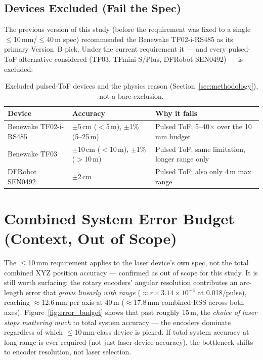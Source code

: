 \documentclass[11pt]{article}
\begin{document}
\subsection{Devices Excluded (Fail the Spec)}

The previous version of this study (before the requirement was fixed to a single $\leq$10\,mm/$\leq$40\,m spec) recommended the Benewake TF02-i-RS485 as its primary Version~B pick. Under the current requirement it --- and every pulsed-ToF alternative considered (TF03, TFmini-S/Plus, DFRobot SEN0492) --- is excluded:

\begin{table}[htbp]
\centering
\small
\begin{tabular}{@{}lll@{}}
\toprule
\textbf{Device} & \textbf{Accuracy} & \textbf{Why it fails} \\
\midrule
Benewake TF02-i-RS485 & $\pm$5\,cm ($<$5\,m), $\pm$1\% (5--25\,m) & Pulsed ToF; 5--40$\times$ over the 10\,mm budget \\
Benewake TF03 & $\pm$10\,cm ($<$10\,m), $\pm$1\% ($>$10\,m) & Pulsed ToF; same limitation, longer range only \\
DFRobot SEN0492 & $\pm$2\,cm & Pulsed ToF; also only 4\,m max range \\
\bottomrule
\end{tabular}
\caption{Excluded pulsed-ToF devices and the physics reason (Section~\ref{sec:methodology}), not a bare exclusion.}
\end{table}

\section{Combined System Error Budget (Context, Out of Scope)}
\label{sec:budget}

The $\leq$10\,mm requirement applies to the laser device's own spec, not the total combined XYZ position accuracy --- confirmed as out of scope for this study. It is still worth surfacing: the rotary encoders' angular resolution contributes an arc-length error that \emph{grows linearly with range} ($\approx r \times 3.14\times10^{-4}$ at 0.018\textdegree/pulse), reaching $\approx$12.6\,mm per axis at 40\,m ($\approx$17.8\,mm combined RSS across both axes). Figure~\ref{fig:error_budget} shows that past roughly 15\,m, the \emph{choice of laser stops mattering much} to total system accuracy --- the encoders dominate regardless of which $\leq$10\,mm-class device is picked. If total system accuracy at long range is ever required (not just laser-device accuracy), the bottleneck shifts to encoder resolution, not laser selection.
\end{document}
